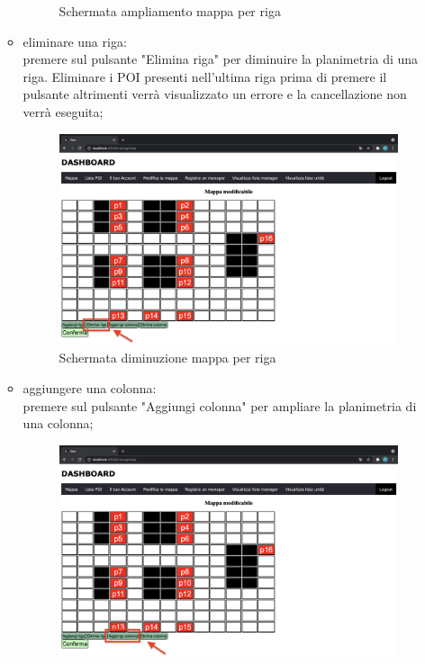 \begin{itemize}
\begin{itemize}
\begin{figure}[H]
                \caption{Schermata ampliamento mappa per riga}
            \end{figure}
            \item eliminare una riga: \\premere sul pulsante "Elimina riga" per diminuire la planimetria di una riga. Eliminare i POI presenti nell'ultima riga prima di premere il pulsante altrimenti verrà visualizzato un errore e la cancellazione non verrà eseguita;
            \begin{figure}[H]
                \centering
                \includegraphics[scale=0.12]{res/images/modificamappa2.png}
                \caption{Schermata diminuzione mappa per riga}
            \end{figure}
            \item aggiungere una colonna: \\premere sul pulsante "Aggiungi colonna" per ampliare la planimetria di una colonna;
            \begin{figure}[H]
                \centering
                \includegraphics[scale=0.12]{res/images/modificamappa3.png}

\end{figure}
\end{itemize}
\end{itemize}
